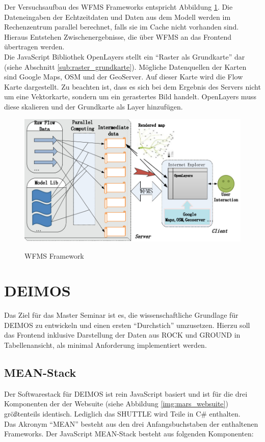 \documentclass[10pt,conference,compsocconf]{IEEEtran}
\begin{document}
Der Versuchsaufbau des WFMS Frameworks entspricht Abbildung \ref{img:wfms}. Die Dateneingaben der Echtzeitdaten und Daten aus dem Modell werden im Rechenzentrum parallel berechnet, falls sie im Cache nicht vorhanden sind. Hieraus Entstehen Zwischenergebnisse, die über WFMS an das Frontend übertragen werden.\\
Die JavaScript Bibliothek OpenLayers stellt ein \enquote{Raster als Grundkarte} dar (siehe Abschnitt \ref{sub:raster_grundkarte}). Mögliche Datenquellen der Karten sind Google Maps, OSM und der GeoServer. Auf dieser Karte wird die Flow Karte dargestellt. Zu beachten ist, dass es sich bei dem Ergebnis des Servers nicht um eine Vektorkarte, sondern um ein gerastertes Bild handelt. OpenLayers muss diese skalieren und der Grundkarte als Layer hinzufügen.

\begin{figure}[H]
  \centering
  	\includegraphics[width=\columnwidth]{img/wfms}\\
  \caption[]{WFMS Framework\cite{wms_flow_mapping}}
  \label{img:wfms}
\end{figure}

\section{DEIMOS}
Das Ziel für das Master Seminar ist es, die wissenschaftliche Grundlage für DEIMOS zu entwickeln und einen ersten \enquote{Durchstich} umzusetzen. Hierzu soll das Frontend inklusive Darstellung der Daten aus ROCK und GROUND in Tabellenansicht, als minimal Anforderung implementiert werden.\\

\subsection{MEAN-Stack}
Der Softwarestack für DEIMOS ist rein JavaScript basiert und ist für die drei Komponenten der der Websuite (siehe Abbildung \ref{img:mars_websuite}) größtenteils identisch. Lediglich das SHUTTLE wird Teile in C\# enthalten. \\
Das Akronym \enquote{MEAN} besteht aus den drei Anfangsbuchstaben der enthaltenen Frameworks. Der JavaScript MEAN-Stack besteht aus folgenden Komponenten:
\end{document}
